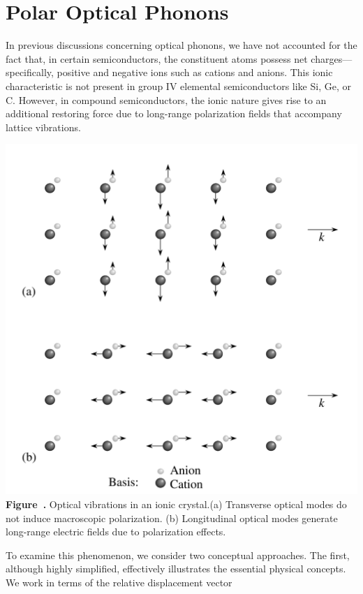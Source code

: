 \section{Polar Optical Phonons}
In previous discussions concerning optical phonons, we have not accounted for the fact that, in certain semiconductors, the constituent atoms possess net charges—specifically, positive and negative ions such as cations and anions. This ionic characteristic is not present in group IV elemental semiconductors like Si, Ge, or C. However, in compound semiconductors, the ionic nature gives rise to an additional restoring force due to long-range polarization fields that accompany lattice vibrations.
\begin{center}
	\begin{minipage}{0.8\textwidth}
		\centering
		\includegraphics[width=\textwidth]{img/OpticalModes.png}
		\\[0.5em]
		\textbf{Figure~\thefigure.} Optical vibrations in an ionic crystal.(a) Transverse optical modes do not induce macroscopic polarization. (b) Longitudinal optical modes generate long-range electric fields due to polarization effects.

		\label{fig:OpticalModes}
	\end{minipage}
\end{center}
To examine this phenomenon, we consider two conceptual approaches. The first, although highly simplified, effectively illustrates the essential physical concepts. We work in terms of the relative displacement vector

